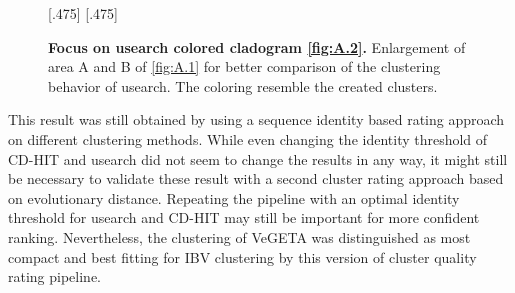     \begin{figure}[!htb]
        \centering
        [.475\textwidth]{}\hfill 
        [.475\textwidth]{}
        \caption[Focus on usearch colored cladogram \autoref{fig:A.2}]{\textbf{Focus on usearch colored cladogram \autoref{fig:A.2}.} Enlargement of area A and B of \autoref{fig:A.1} for better comparison of the clustering behavior of usearch. The coloring resemble the created clusters.}
        \label{fig:3.6}
    \end{figure}

    This result was still obtained by using a sequence identity based rating approach on different clustering methods. While even changing the identity threshold of CD-HIT and usearch did not seem to change the results in any way, it might still be necessary to validate these result with a second cluster rating approach based on evolutionary distance. Repeating the pipeline with an optimal identity threshold for usearch and CD-HIT may still be important for more confident ranking. Nevertheless, the clustering of VeGETA was distinguished as most compact and best fitting for \gls{IBV} clustering by this version of cluster quality rating pipeline.
    
